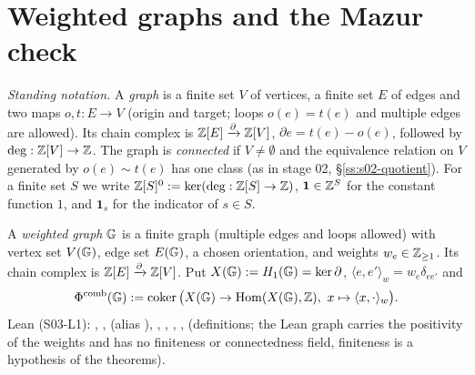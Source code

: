 \section{Weighted graphs and the Mazur check}\label{ss:s03-graphs}

\emph{Standing notation.} A \emph{graph} is a finite set $V$ of vertices, a finite set $E$ of edges and two maps
$o,t:E\to V$ (origin and target; loops $o(e)=t(e)$ and multiple edges are allowed). Its chain complex is
$\mathbb{Z}[E]\xrightarrow{\partial}\mathbb{Z}[V]$, $\partial e=t(e)-o(e)$, followed by $\deg:\mathbb{Z}[V]\to\mathbb{Z}$. The graph is \emph{connected} if $V\ne\emptyset$ and
the equivalence relation on $V$ generated by $o(e)\sim t(e)$ has one class (as in stage 02, \S\ref{ss:s02-quotient}). For a finite set $S$
we write $\mathbb{Z}[S]^0:=\ker(\deg:\mathbb{Z}[S]\to\mathbb{Z})$, $\mathbf 1\in\mathbb{Z}^S$ for the constant function $1$, and $\mathbf 1_s$ for the indicator of $s\in S$.

\begin{definition}\label{def:s03-graph}
A \emph{weighted graph} $\mathbb{G}$ is a finite graph (multiple edges and loops allowed) with vertex set $V(\mathbb{G})$, edge set $E(\mathbb{G})$, a
chosen orientation, and weights $w_e\in\mathbb{Z}_{\ge1}$. Its chain complex is $\mathbb{Z}[E]\xrightarrow\partial\mathbb{Z}[V]$. Put
$X(\mathbb{G}):=H_1(\mathbb{G})=\ker\partial$, $\langle e,e'\rangle_w=w_e\delta_{ee'}$ and
\[\Phicomb(\G):=\coker\big(X(\G)\to\Hom(X(\G),\Z),\ x\mapsto\langle x,\cdot\rangle_w\big).\]
 Lean (S03-L1): , ,
 (alias ), ,
, , ,
 \stformal{} (definitions; the Lean graph carries the positivity of the weights and has no finiteness
or connectedness field, finiteness is a hypothesis of the theorems).
\end{definition}

